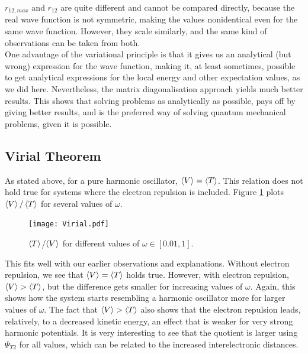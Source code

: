 \documentclass[10pt,a4paper]{article}
\begin{document}
$r_{12,max}$ and $r_{12}$ are quite different and cannot be compared directly, because the real wave function is not symmetric, making the values nonidentical even for the same wave function. However, they scale similarly, and the same kind of observations can be taken from both. \\
One advantage of the variational principle is that it gives us an analytical (but wrong) expression for the wave function, making it, at least sometimes, possible to get analytical expressions for the local energy and other expectation values, as we did here. Nevertheless, the matrix diagonalisation approach yields much better results. This shows that solving problems as analytically as possible, pays off by giving better results, and is the preferred way of solving quantum mechanical problems, given it is possible.  
\subsection{Virial Theorem}
As stated above, for a pure harmonic oscillator, $\braket{V}=\braket{T}$. This relation does not hold true for systems where the electron repulsion is included. Figure \ref{Virial} plots $\braket{V}/\braket{T}$ for several values of $\omega$.
\begin{figure}[H]
\centering
\texttt{[image: Virial.pdf]}
\caption[$\braket{T}$/$0\braket{V}$ as function of $\omega$]{$\braket{T}$/$\braket{V}$ for different values of $\omega\in[0.01,1]$.}\label{Virial}
\end{figure}
This fits well with our earlier observations and explanations. Without electron repulsion, we see that $\braket{V}=\braket{T}$ holds true. However, with electron repulsion, $\braket{V}>\braket{T}$, but the difference gets smaller for increasing values of $\omega$. Again, this shows how the system starts resembling a harmonic oscillator more for larger values of $\omega$. The fact that $\braket{V}>\braket{T}$ also shows that the electron repulsion leads, relatively, to a decreased kinetic energy, an effect that is weaker for very strong harmonic potentials. It is very interesting to see that the quotient is larger using $\Psi_{T2}$ for all values, which can be related to the increased interelectronic distances. 
\end{document}
